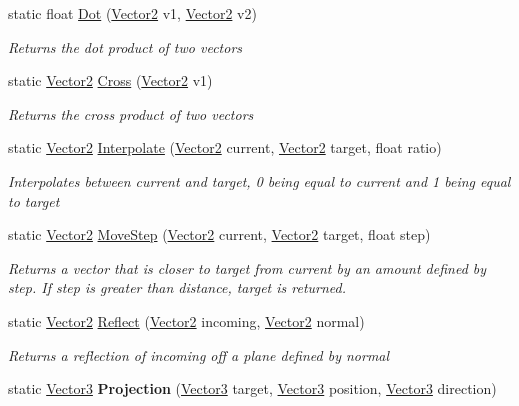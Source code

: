 \begin{DoxyCompactItemize}
\item 
static float \hyperlink{struct_engine_1_1_vector2_a32c2beddb5c2d01fd7520a5a295b2e09}{Dot} (\hyperlink{struct_engine_1_1_vector2}{Vector2} v1, \hyperlink{struct_engine_1_1_vector2}{Vector2} v2)
\begin{DoxyCompactList}\small\item\em Returns the dot product of two vectors \end{DoxyCompactList}\item 
static \hyperlink{struct_engine_1_1_vector2}{Vector2} \hyperlink{struct_engine_1_1_vector2_aec40afc1610871e75eec7bb4403af5a6}{Cross} (\hyperlink{struct_engine_1_1_vector2}{Vector2} v1)
\begin{DoxyCompactList}\small\item\em Returns the cross product of two vectors \end{DoxyCompactList}\item 
static \hyperlink{struct_engine_1_1_vector2}{Vector2} \hyperlink{struct_engine_1_1_vector2_a93b76fc9054d367274260d0535339087}{Interpolate} (\hyperlink{struct_engine_1_1_vector2}{Vector2} current, \hyperlink{struct_engine_1_1_vector2}{Vector2} target, float ratio)
\begin{DoxyCompactList}\small\item\em Interpolates between current and target, 0 being equal to current and 1 being equal to target \end{DoxyCompactList}\item 
static \hyperlink{struct_engine_1_1_vector2}{Vector2} \hyperlink{struct_engine_1_1_vector2_a6eeee8fff1846231e862f998a4b3f72f}{Move\-Step} (\hyperlink{struct_engine_1_1_vector2}{Vector2} current, \hyperlink{struct_engine_1_1_vector2}{Vector2} target, float step)
\begin{DoxyCompactList}\small\item\em Returns a vector that is closer to target from current by an amount defined by step. If step is greater than distance, target is returned. \end{DoxyCompactList}\item 
static \hyperlink{struct_engine_1_1_vector2}{Vector2} \hyperlink{struct_engine_1_1_vector2_a85cf88333ff7ddff092802461e847157}{Reflect} (\hyperlink{struct_engine_1_1_vector2}{Vector2} incoming, \hyperlink{struct_engine_1_1_vector2}{Vector2} normal)
\begin{DoxyCompactList}\small\item\em Returns a reflection of incoming off a plane defined by normal \end{DoxyCompactList}\item 
\hypertarget{struct_engine_1_1_vector2_a09d5adcb97f694f1c338a6fccb0b4fda}{static \hyperlink{struct_engine_1_1_vector3}{Vector3} {\bfseries Projection} (\hyperlink{struct_engine_1_1_vector3}{Vector3} target, \hyperlink{struct_engine_1_1_vector3}{Vector3} position, \hyperlink{struct_engine_1_1_vector3}{Vector3} direction)}\label{struct_engine_1_1_vector2_a09d5adcb97f694f1c338a6fccb0b4fda}


\end{DoxyCompactItemize}
